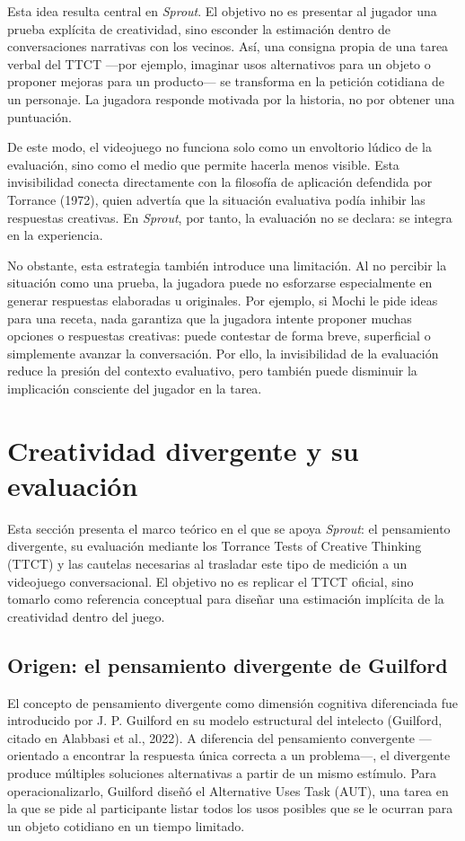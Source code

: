 \documentclass[12pt,twoside,titlepage]{report}
\begin{document}
Esta idea resulta central en \textit{Sprout}. El objetivo no es presentar al jugador una prueba explícita de creatividad, sino esconder la estimación dentro de conversaciones narrativas con los vecinos. Así, una consigna propia de una tarea verbal del TTCT ---por ejemplo, imaginar usos alternativos para un objeto o proponer mejoras para un producto--- se transforma en la petición cotidiana de un personaje. La jugadora responde motivada por la historia, no por obtener una puntuación.

De este modo, el videojuego no funciona solo como un envoltorio lúdico de la evaluación, sino como el medio que permite hacerla menos visible. Esta invisibilidad conecta directamente con la filosofía de aplicación defendida por Torrance (1972), quien advertía que la situación evaluativa podía inhibir las respuestas creativas. En \textit{Sprout}, por tanto, la evaluación no se declara: se integra en la experiencia.

No obstante, esta estrategia también introduce una limitación. Al no percibir la situación como una prueba, la jugadora puede no esforzarse especialmente en generar respuestas elaboradas u originales. Por ejemplo, si Mochi le pide ideas para una receta, nada garantiza que la jugadora intente proponer muchas opciones o respuestas creativas: puede contestar de forma breve, superficial o simplemente avanzar la conversación. Por ello, la invisibilidad de la evaluación reduce la presión del contexto evaluativo, pero también puede disminuir la implicación consciente del jugador en la tarea.

\section{Creatividad divergente y su evaluación}

Esta sección presenta el marco teórico en el que se apoya \textit{Sprout}: el pensamiento divergente, su evaluación mediante los Torrance Tests of Creative Thinking (TTCT) y las cautelas necesarias al trasladar este tipo de medición a un videojuego conversacional. El objetivo no es replicar el TTCT oficial, sino tomarlo como referencia conceptual para diseñar una estimación implícita de la creatividad dentro del juego.


\subsection{Origen: el pensamiento divergente de Guilford}

El concepto de pensamiento divergente como dimensión cognitiva diferenciada fue introducido por J. P. Guilford en su modelo estructural del intelecto (Guilford, citado en Alabbasi et al., 2022). A diferencia del pensamiento convergente ---orientado a encontrar la respuesta única correcta a un problema---, el divergente produce múltiples soluciones alternativas a partir de un mismo estímulo. Para operacionalizarlo, Guilford diseñó el Alternative Uses Task (AUT), una tarea en la que se pide al participante listar todos los usos posibles que se le ocurran para un objeto cotidiano en un tiempo limitado.
\end{document}
